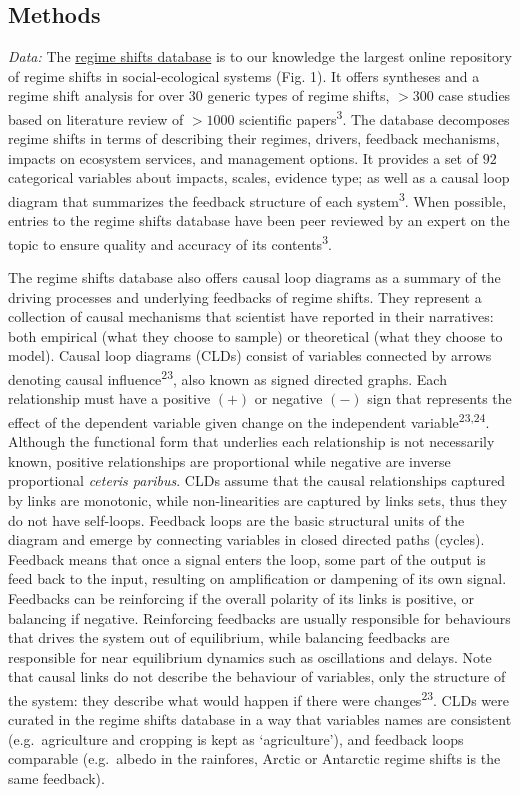 \documentclass[9pt,]{article}
\begin{document}
\subsection{Methods}\label{methods}

\textit{Data:} The \href{www.regimeshifts.org}{regime shifts database}
is to our knowledge the largest online repository of regime shifts in
social-ecological systems (Fig. 1). It offers syntheses and a regime
shift analysis for over \(30\) generic types of regime shifts, \(> 300\)
case studies based on literature review of \(> 1000\) scientific
papers\textsuperscript{3}. The database decomposes regime shifts in
terms of describing their regimes, drivers, feedback mechanisms, impacts
on ecosystem services, and management options. It provides a set of
\(92\) categorical variables about impacts, scales, evidence type; as
well as a causal loop diagram that summarizes the feedback structure of
each system\textsuperscript{3}. When possible, entries to the regime
shifts database have been peer reviewed by an expert on the topic to
ensure quality and accuracy of its contents\textsuperscript{3}.

The regime shifts database also offers causal loop diagrams as a summary
of the driving processes and underlying feedbacks of regime shifts. They
represent a collection of causal mechanisms that scientist have reported
in their narratives: both empirical (what they choose to sample) or
theoretical (what they choose to model). Causal loop diagrams (CLDs)
consist of variables connected by arrows denoting causal
influence\textsuperscript{23}, also known as signed directed graphs.
Each relationship must have a positive \((+)\) or negative \((-)\) sign
that represents the effect of the dependent variable given change on the
independent variable\textsuperscript{23,24}. Although the functional
form that underlies each relationship is not necessarily known, positive
relationships are proportional while negative are inverse proportional
\emph{ceteris paribus}. CLDs assume that the causal relationships
captured by links are monotonic, while non-linearities are captured by
links sets, thus they do not have self-loops. Feedback loops are the
basic structural units of the diagram and emerge by connecting variables
in closed directed paths (cycles). Feedback means that once a signal
enters the loop, some part of the output is feed back to the input,
resulting on amplification or dampening of its own signal. Feedbacks can
be reinforcing if the overall polarity of its links is positive, or
balancing if negative. Reinforcing feedbacks are usually responsible for
behaviours that drives the system out of equilibrium, while balancing
feedbacks are responsible for near equilibrium dynamics such as
oscillations and delays. Note that causal links do not describe the
behaviour of variables, only the structure of the system: they describe
what would happen if there were changes\textsuperscript{23}. CLDs were
curated in the regime shifts database in a way that variables names are
consistent (e.g.~agriculture and cropping is kept as `agriculture'), and
feedback loops comparable (e.g.~albedo in the rainfores, Arctic or
Antarctic regime shifts is the same feedback).
\end{document}
